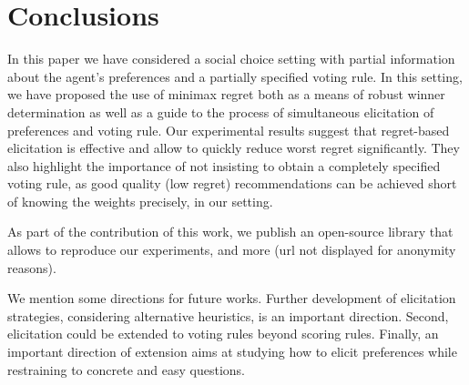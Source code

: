 \documentclass[sigconf, anonymous]{aamas}
\begin{document}
\section{Conclusions}  
\label{sec:conclusions}
In this paper we have considered a social choice setting with partial information about the agent's preferences and a partially specified voting rule.
In this setting, we have proposed the use of minimax regret both as a means of robust winner determination as well as a guide to the process of simultaneous elicitation of preferences and voting rule.
Our experimental results %
suggest that regret-based elicitation is effective and allow to quickly reduce worst regret significantly. They also highlight the importance of not insisting to obtain a completely specified voting rule, as good quality (low regret) recommendations can be achieved short of knowing the weights precisely, in our setting.

As part of the contribution of this work, we publish an open-source library that allows to reproduce our experiments, and more (url not displayed for anonymity reasons).

We mention some directions for future works.
Further development of elicitation strategies, considering alternative heuristics, is an important direction. 
Second, elicitation could be extended to voting rules beyond scoring rules. 
Finally, an important direction of extension aims at studying how to elicit preferences while restraining to concrete and easy questions.


\end{document}
